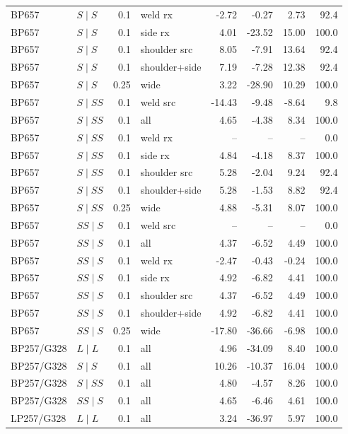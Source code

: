 {\begin{longtable}{@{}llrlrrrr@{}}
BP657 & $S\mid S$ & 0.1 & weld rx & -2.72 & -0.27 & 2.73 & 92.4 \\
BP657 & $S\mid S$ & 0.1 & side rx & 4.01 & -23.52 & 15.00 & 100.0 \\
BP657 & $S\mid S$ & 0.1 & shoulder src & 8.05 & -7.91 & 13.64 & 92.4 \\
BP657 & $S\mid S$ & 0.1 & shoulder+side & 7.19 & -7.28 & 12.38 & 92.4 \\
BP657 & $S\mid S$ & 0.25 & wide & 3.22 & -28.90 & 10.29 & 100.0 \\
BP657 & $S\mid SS$ & 0.1 & weld src & -14.43 & -9.48 & -8.64 & 9.8 \\
BP657 & $S\mid SS$ & 0.1 & all & 4.65 & -4.38 & 8.34 & 100.0 \\
BP657 & $S\mid SS$ & 0.1 & weld rx & -- & -- & -- & 0.0 \\
BP657 & $S\mid SS$ & 0.1 & side rx & 4.84 & -4.18 & 8.37 & 100.0 \\
BP657 & $S\mid SS$ & 0.1 & shoulder src & 5.28 & -2.04 & 9.24 & 92.4 \\
BP657 & $S\mid SS$ & 0.1 & shoulder+side & 5.28 & -1.53 & 8.82 & 92.4 \\
BP657 & $S\mid SS$ & 0.25 & wide & 4.88 & -5.31 & 8.07 & 100.0 \\
BP657 & $SS\mid S$ & 0.1 & weld src & -- & -- & -- & 0.0 \\
BP657 & $SS\mid S$ & 0.1 & all & 4.37 & -6.52 & 4.49 & 100.0 \\
BP657 & $SS\mid S$ & 0.1 & weld rx & -2.47 & -0.43 & -0.24 & 100.0 \\
BP657 & $SS\mid S$ & 0.1 & side rx & 4.92 & -6.82 & 4.41 & 100.0 \\
BP657 & $SS\mid S$ & 0.1 & shoulder src & 4.37 & -6.52 & 4.49 & 100.0 \\
BP657 & $SS\mid S$ & 0.1 & shoulder+side & 4.92 & -6.82 & 4.41 & 100.0 \\
BP657 & $SS\mid S$ & 0.25 & wide & -17.80 & -36.66 & -6.98 & 100.0 \\
BP257/G328 & $L\mid L$ & 0.1 & all & 4.96 & -34.09 & 8.40 & 100.0 \\
BP257/G328 & $S\mid S$ & 0.1 & all & 10.26 & -10.37 & 16.04 & 100.0 \\
BP257/G328 & $S\mid SS$ & 0.1 & all & 4.80 & -4.57 & 8.26 & 100.0 \\
BP257/G328 & $SS\mid S$ & 0.1 & all & 4.65 & -6.46 & 4.61 & 100.0 \\
LP257/G328 & $L\mid L$ & 0.1 & all & 3.24 & -36.97 & 5.97 & 100.0 \\

\end{longtable}}
